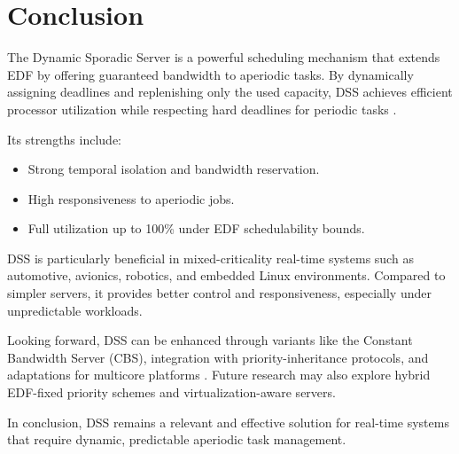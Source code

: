 \documentclass[conference]{IEEEtran}
\begin{document}
\vspace{1em}
\section{Conclusion}

The Dynamic Sporadic Server is a powerful scheduling mechanism that extends EDF by offering guaranteed bandwidth to aperiodic tasks. By dynamically assigning deadlines and replenishing only the used capacity, DSS achieves efficient processor utilization while respecting hard deadlines for periodic tasks \cite{spuri1994efficient, buttazzo2011hard}.

Its strengths include:
\begin{itemize}
    \item Strong temporal isolation and bandwidth reservation.
    \item High responsiveness to aperiodic jobs.
    \item Full utilization up to 100\% under EDF schedulability bounds.
\end{itemize}

DSS is particularly beneficial in mixed-criticality real-time systems such as automotive, avionics, robotics, and embedded Linux environments. Compared to simpler servers, it provides better control and responsiveness, especially under unpredictable workloads.

Looking forward, DSS can be enhanced through variants like the Constant Bandwidth Server (CBS), integration with priority-inheritance protocols, and adaptations for multicore platforms \cite{laplante2011real}. Future research may also explore hybrid EDF-fixed priority schemes and virtualization-aware servers.

In conclusion, DSS remains a relevant and effective solution for real-time systems that require dynamic, predictable aperiodic task management.



\printbibliography


\vspace{12pt}
\color{red}
\end{document}
